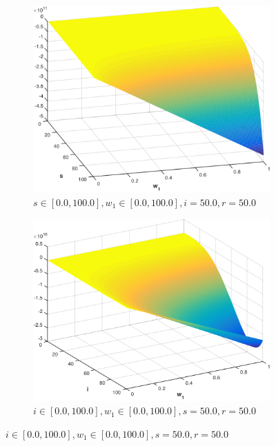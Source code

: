 \begin{figure}[t!]
    \centering
    \begin{subfigure}[b]{0.4\textwidth}
        \includegraphics[width=\linewidth, height=0.8\linewidth]{images/sir_s_w1}
        \caption{$ s \in \left[ 0.0, 100.0 \right], w_1 \in \left[ 0.0, 100.0 \right], i = 50.0, r = 50.0$}
        \label{fig:sir_s_w1}
        \vspace{1em}
    \end{subfigure}
    
    \begin{subfigure}[b]{0.4\textwidth}
        \includegraphics[width=\linewidth, height=0.8\linewidth]{images/sir_i_w1}
        \caption{$ i \in \left[ 0.0, 100.0 \right],w_1 \in \left[ 0.0, 100.0 \right], s = 50.0, r = 50.0$}
        \label{fig:sir_i_w1}
    \end{subfigure}  
    

\end{figure}
